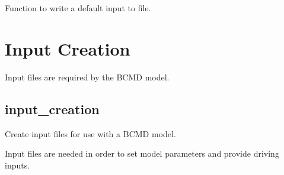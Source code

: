 \documentclass[letterpaper,10pt,english]{sphinxmanual}
\begin{document}
\begin{fulllineitems}
\begin{fulllineitems}
\end{fulllineitems}


\begin{fulllineitems}
\label{\detokenize{bcmdModel:bayescmd.bcmdModel.ModelBCMD.write_initialised_input}}
Function to write a default input to file.

\end{fulllineitems}


\end{fulllineitems}



\section{Input Creation}
\label{\detokenize{bcmdModel:input-creation}}
Input files are required by the BCMD model.


\subsection{input\_creation}
\label{\detokenize{bcmdModel:module-bayescmd.bcmdModel.input_creation}}\label{\detokenize{bcmdModel:id1}}
Create input files for use with a BCMD model.

Input files are needed in order to set model parameters and provide driving
inputs.
\end{document}

